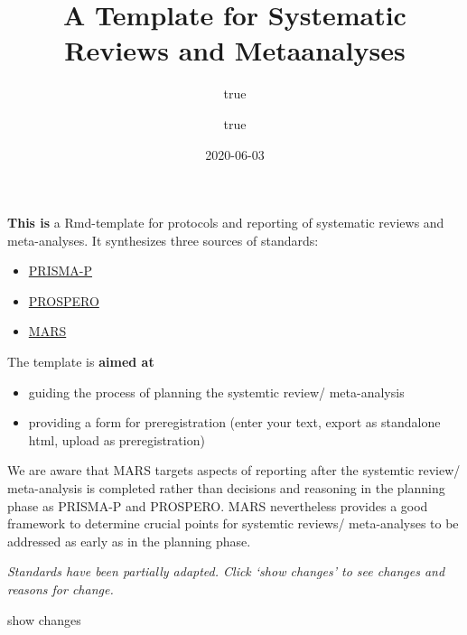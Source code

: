 \documentclass[]{article}
\title{A Template for Systematic Reviews and Metaanalyses}
\author{true \and true}
\date{2020-06-03}
\providecommand{\tightlist}{%
  \setlength{\itemsep}{0pt}\setlength{\parskip}{0pt}}
\begin{document}
\maketitle

{
\setcounter{tocdepth}{2}
\tableofcontents
}
\textbf{This is} a Rmd-template for protocols and reporting of
systematic reviews and meta-analyses. It synthesizes three sources of
standards:

\begin{itemize}
\tightlist
\item
  \href{https://doi.org/10.1136/bmj.i4086}{PRISMA-P}
\item
  \href{https://www.crd.york.ac.uk/prospero/}{PROSPERO}
\item
  \href{https://doi.org/10.1037/amp0000389}{MARS}
\end{itemize}

The template is \textbf{aimed at}

\begin{itemize}
\tightlist
\item
  guiding the process of planning the systemtic review/ meta-analysis
\item
  providing a form for preregistration (enter your text, export as
  standalone html, upload as preregistration)
\end{itemize}

We are aware that MARS targets aspects of reporting after the systemtic
review/ meta-analysis is completed rather than decisions and reasoning
in the planning phase as PRISMA-P and PROSPERO. MARS nevertheless
provides a good framework to determine crucial points for systemtic
reviews/ meta-analyses to be addressed as early as in the planning
phase.

\emph{Standards have been partially adapted. Click `show changes' to see
changes and reasons for change.}

show changes
\end{document}
